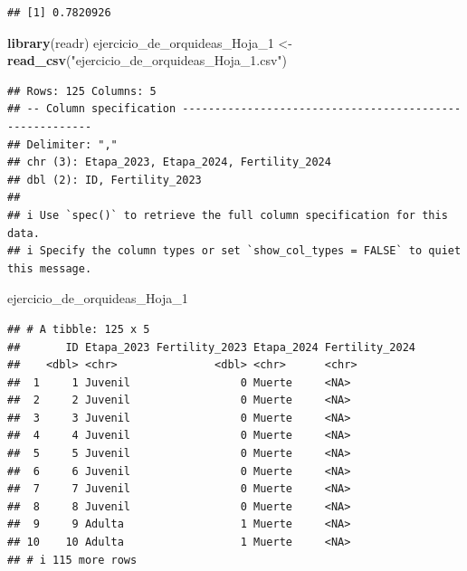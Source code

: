 \documentclass[
]{book}
\newenvironment{Shaded}{\begin{snugshade}}{\end{snugshade}}
\newcommand{\FunctionTok}[1]{\textcolor[rgb]{0.13,0.29,0.53}{\textbf{#1}}}
\newcommand{\NormalTok}[1]{#1}
\newcommand{\OtherTok}[1]{\textcolor[rgb]{0.56,0.35,0.01}{#1}}
\newcommand{\SpecialCharTok}[1]{\textcolor[rgb]{0.81,0.36,0.00}{\textbf{#1}}}
\newcommand{\StringTok}[1]{\textcolor[rgb]{0.31,0.60,0.02}{#1}}
\theoremstyle{definition}
\theoremstyle{definition}
\theoremstyle{definition}
\theoremstyle{definition}
\theoremstyle{remark}
\begin{document}
\begin{verbatim}
## [1] 0.7820926
\end{verbatim}

\begin{Shaded}
\begin{Highlighting}[]
\FunctionTok{library}\NormalTok{(readr)}
\NormalTok{ejercicio\_de\_orquideas\_Hoja\_1 }\OtherTok{\textless{}{-}} \FunctionTok{read\_csv}\NormalTok{(}\StringTok{"ejercicio\_de\_orquideas\_Hoja\_1.csv"}\NormalTok{)}
\end{Highlighting}
\end{Shaded}

\begin{verbatim}
## Rows: 125 Columns: 5
## -- Column specification --------------------------------------------------------
## Delimiter: ","
## chr (3): Etapa_2023, Etapa_2024, Fertility_2024
## dbl (2): ID, Fertility_2023
## 
## i Use `spec()` to retrieve the full column specification for this data.
## i Specify the column types or set `show_col_types = FALSE` to quiet this message.
\end{verbatim}

\begin{Shaded}
\begin{Highlighting}[]
\NormalTok{ejercicio\_de\_orquideas\_Hoja\_1}
\end{Highlighting}
\end{Shaded}

\begin{verbatim}
## # A tibble: 125 x 5
##       ID Etapa_2023 Fertility_2023 Etapa_2024 Fertility_2024
##    <dbl> <chr>               <dbl> <chr>      <chr>         
##  1     1 Juvenil                 0 Muerte     <NA>          
##  2     2 Juvenil                 0 Muerte     <NA>          
##  3     3 Juvenil                 0 Muerte     <NA>          
##  4     4 Juvenil                 0 Muerte     <NA>          
##  5     5 Juvenil                 0 Muerte     <NA>          
##  6     6 Juvenil                 0 Muerte     <NA>          
##  7     7 Juvenil                 0 Muerte     <NA>          
##  8     8 Juvenil                 0 Muerte     <NA>          
##  9     9 Adulta                  1 Muerte     <NA>          
## 10    10 Adulta                  1 Muerte     <NA>          
## # i 115 more rows
\end{verbatim}

\begin{Shaded}
\end{Shaded}
\end{document}
